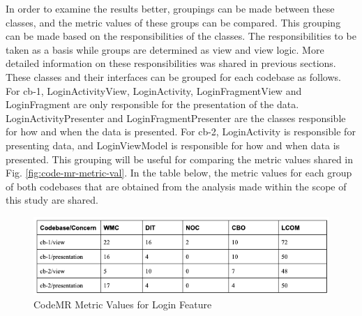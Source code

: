 In order to examine the results better, groupings can be made between these classes, and the metric values of these groups can be compared. This grouping can be made based on the responsibilities of the classes. The responsibilities to be taken as a basis while groups are determined as view and view logic. More detailed information on these responsibilities was shared in previous sections. These classes and their interfaces can be grouped for each codebase as follows. For cb-1, LoginActivityView, LoginActivity, LoginFragmentView and LoginFragment are only responsible for the presentation of the data.  LoginActivityPresenter and LoginFragmentPresenter are the classes responsible for how and when the data is presented. For cb-2, LoginActivity is responsible for presenting data, and LoginViewModel is responsible for how and when data is presented. This grouping will be useful for comparing the metric values shared in Fig. \ref{fig:code-mr-metric-val}. In the table below, the metric values for each group of both codebases that are obtained from the analysis made within the scope of this study are shared.

\begin{figure}[ht!]
    \centering
    \includegraphics[scale=0.65]{figures/login-metric-table-2.png}
    \caption{CodeMR Metric Values for Login Feature}
    \label{fig:login-metric-table-2}
\end{figure}
\FloatBarrier